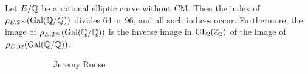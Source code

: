 \begin{frame}[plain] \footnotesize
\begin{thm}
Let $E/\mathbb{Q}$ be a rational elliptic curve without CM. Then the index of $\rho_{E,2^\infty}(\operatorname{Gal}(\overline{\mathbb{Q}}/Q))$ divides 64 or 96, and all such indices occur. Furthermore, the image of $\rho_{E,2^\infty}(\operatorname{Gal}(\overline{\mathbb{Q}}/\mathbb{Q}))$ is the inverse image in $\operatorname{GL}_2(\mathbb{Z}_2)$ of the image of $\rho_{E,32}(\operatorname{Gal}(\overline{\mathbb{Q}}/\mathbb{Q}))$.
\end{thm}
	\begin{figure}[h]
	\centering
	\begin{subfigure}{0.3\textwidth}
	\captionsetup{labelformat=empty}
	\centering
	\caption{Jeremy Rouse}
	\end{subfigure}
	\begin{subfigure}{0.3\textwidth}
	\captionsetup{labelformat=empty}
	\centering

\end{subfigure}
\end{figure}
\end{frame}
